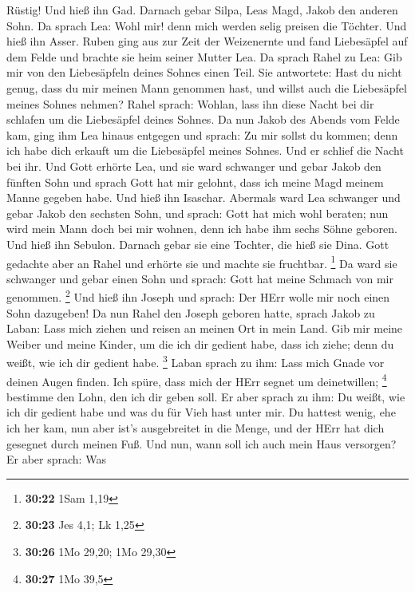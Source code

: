 Rüstig! Und hieß ihn Gad.  Darnach gebar Silpa, Leas Magd,
Jakob den anderen Sohn.  Da sprach Lea: Wohl mir! denn mich
werden selig preisen die Töchter. Und hieß ihn Asser. 
Ruben ging aus zur Zeit der Weizenernte und fand Liebesäpfel auf dem
Felde und brachte sie heim seiner Mutter Lea. Da sprach Rahel zu Lea:
Gib mir von den Liebesäpfeln deines Sohnes einen Teil.  Sie
antwortete: Hast du nicht genug, dass du mir meinen Mann genommen hast,
und willst auch die Liebesäpfel meines Sohnes nehmen? Rahel sprach:
Wohlan, lass ihn diese Nacht bei dir schlafen um die Liebesäpfel deines
Sohnes.  Da nun Jakob des Abends vom Felde kam, ging ihm
Lea hinaus entgegen und sprach: Zu mir sollst du kommen; denn ich habe
dich erkauft um die Liebesäpfel meines Sohnes. Und er schlief die Nacht
bei ihr.  Und Gott erhörte Lea, und sie ward schwanger und
gebar Jakob den fünften Sohn  und sprach Gott hat mir
gelohnt, dass ich meine Magd meinem Manne gegeben habe. Und hieß ihn
Isaschar.  Abermals ward Lea schwanger und gebar Jakob den
sechsten Sohn,  und sprach: Gott hat mich wohl beraten; nun
wird mein Mann doch bei mir wohnen, denn ich habe ihm sechs Söhne
geboren. Und hieß ihn Sebulon.  Darnach gebar sie eine
Tochter, die hieß sie Dina.  Gott gedachte aber an Rahel
und erhörte sie und machte sie fruchtbar. \footnote{\textbf{30:22} 1Sam
  1,19}  Da ward sie schwanger und gebar einen Sohn und
sprach: Gott hat meine Schmach von mir genommen. \footnote{\textbf{30:23}
  Jes 4,1; Lk 1,25}  Und hieß ihn Joseph und sprach: Der
HErr wolle mir noch einen Sohn dazugeben!  Da nun Rahel den
Joseph geboren hatte, sprach Jakob zu Laban: Lass mich ziehen und reisen
an meinen Ort in mein Land.  Gib mir meine Weiber und meine
Kinder, um die ich dir gedient habe, dass ich ziehe; denn du weißt, wie
ich dir gedient habe. \footnote{\textbf{30:26} 1Mo 29,20; 1Mo 29,30}
 Laban sprach zu ihm: Lass mich Gnade vor deinen Augen
finden. Ich spüre, dass mich der HErr segnet um deinetwillen;
\footnote{\textbf{30:27} 1Mo 39,5}  bestimme den Lohn, den
ich dir geben soll.  Er aber sprach zu ihm: Du weißt, wie
ich dir gedient habe und was du für Vieh hast unter mir. 
Du hattest wenig, ehe ich her kam, nun aber ist's ausgebreitet in die
Menge, und der HErr hat dich gesegnet durch meinen Fuß. Und nun, wann
soll ich auch mein Haus versorgen?  Er aber sprach: Was

